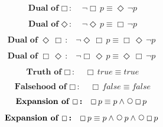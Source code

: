 \documentclass[12pt, fleqn, leqno]{article}
\newcommand{\Next}{\;\,\text{\raisebox{3.5pt}{\circle{6}}}}
\newcommand{\Event}{\Diamond\,}
\newcommand{\Always}{\Box\,}
\newcommand{\spacer}{\vspace{-30pt}}
\begin{document}
\spacer

\begin{equation}\label{E:dualAlways}
\textbf{Dual of $\Always$:}\quad \neg\Always p \equiv \Event\neg p
\end{equation}

\spacer

\begin{equation}\label{E:dualEvent}
\textbf{Dual of $\Event$:}\quad \neg\Event p \equiv \Always\neg p
\end{equation}

\spacer

\begin{equation}\label{E:dualEventAlways}
\textbf{Dual of $\Event \Always$:}\quad \neg \Event\Always p \equiv \Always\Event \neg p
\end{equation}

\spacer

\begin{equation}\label{E:dualAlwaysEvent}
\textbf{Dual of $\Always \Event$:}\quad \neg \Always\Event p \equiv \Event \Always\neg p
\end{equation}

\spacer

\begin{equation}\label{E:alwaysTrue}
\textbf{Truth of $\Always$:}\quad \Always true \equiv true
\end{equation}

\spacer

\begin{equation}\label{E:alwaysFalse}
\textbf{Falsehood of $\Always$:}\quad \Always false \equiv false
\end{equation}

\spacer

\begin{equation}\label{E:expansionAlways}
\textbf{Expansion of $\Always$:}\quad \Always p \equiv p \land \Next\Always p
\end{equation}

\spacer

\begin{equation}\label{E:expansionAlways2}
\textbf{Expansion of $\Always$:}\quad \Always p \equiv p \land \Next p \land \Next\Always p
\end{equation}
\end{document}
